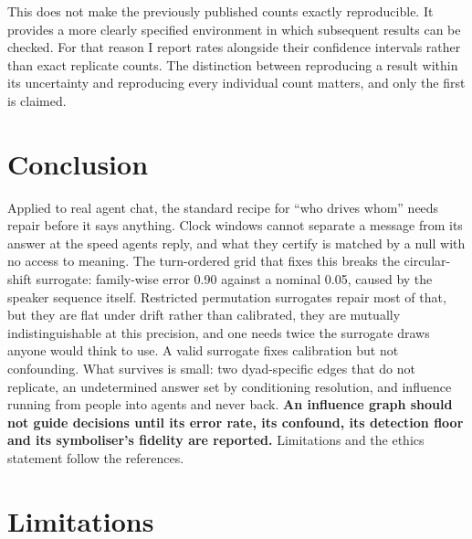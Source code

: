 \documentclass[10pt]{article}
\begin{document}
This does not make the previously published counts exactly reproducible. It provides a more clearly
specified environment in which subsequent results can be checked. For that reason I report rates
alongside their confidence intervals rather than exact replicate counts. The distinction between
reproducing a result within its uncertainty and reproducing every individual count matters, and only
the first is claimed.

\section{Conclusion}

Applied to real agent chat, the standard recipe for ``who drives whom'' needs repair before it says
anything. Clock windows cannot separate a message from its answer at the speed agents reply, and what
they certify is matched by a null with no access to meaning. The turn-ordered grid that fixes this
breaks the circular-shift surrogate: family-wise error 0.90 against a nominal 0.05, caused by the
speaker sequence itself. Restricted permutation surrogates repair most of that, but they are flat
under drift rather than calibrated, they are mutually indistinguishable at this precision, and one
needs twice the surrogate draws anyone would think to use. A valid surrogate fixes calibration but
not confounding. What survives is small: two dyad-specific edges that do not replicate, an
undetermined answer set by conditioning resolution, and influence running from people into agents
and never back. \textbf{An influence graph should not guide decisions until its error rate, its
confound, its detection floor and its symboliser's fidelity are reported.} Limitations and the
ethics statement follow the references.



\section*{Limitations}
\end{document}
